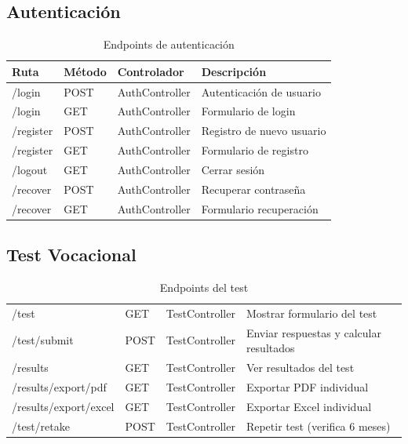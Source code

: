 \documentclass[12pt, a4paper]{report}
\begin{document}
\subsection{Autenticación}
\begin{table}[H]
\centering
\begin{tabularx}{\textwidth}{|l|l|l|X|}
\hline
\textbf{Ruta} & \textbf{Método} & \textbf{Controlador} & \textbf{Descripción} \\
\hline
/login & POST & AuthController & Autenticación de usuario \\
/login & GET & AuthController & Formulario de login \\
/register & POST & AuthController & Registro de nuevo usuario \\
/register & GET & AuthController & Formulario de registro \\
/logout & GET & AuthController & Cerrar sesión \\
/recover & POST & AuthController & Recuperar contraseña \\
/recover & GET & AuthController & Formulario recuperación \\
\hline
\end{tabularx}
\caption{Endpoints de autenticación}
\end{table}

\subsection{Test Vocacional}
\begin{table}[H]
\centering
\begin{tabularx}{\textwidth}{|l|l|l|X|}
\hline
/test & GET & TestController & Mostrar formulario del test \\
/test/submit & POST & TestController & Enviar respuestas y calcular resultados \\
/results & GET & TestController & Ver resultados del test \\
/results/export/pdf & GET & TestController & Exportar PDF individual \\
/results/export/excel & GET & TestController & Exportar Excel individual \\
/test/retake & POST & TestController & Repetir test (verifica 6 meses) \\
\hline
\end{tabularx}
\caption{Endpoints del test}
\end{table}
\end{document}
